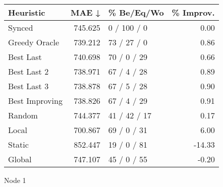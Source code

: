 \begin{tabular}{lrlr}
\toprule
\textbf{Heuristic} & \textbf{MAE ↓} & \textbf{\% Be/Eq/Wo} & \textbf{\% Improv.} \\
\midrule
            Synced &        745.625 &          0 / 100 / 0 &                0.00 \\
     Greedy Oracle &        739.212 &          73 / 27 / 0 &                0.86 \\
         Best Last &        740.698 &          70 / 0 / 29 &                0.66 \\
       Best Last 2 &        738.971 &          67 / 4 / 28 &                0.89 \\
       Best Last 3 &        738.878 &          67 / 5 / 28 &                0.90 \\
    Best Improving &        738.826 &          67 / 4 / 29 &                0.91 \\
            Random &        744.377 &         41 / 42 / 17 &                0.17 \\
             Local &        700.867 &          69 / 0 / 31 &                6.00 \\
            Static &        852.447 &          19 / 0 / 81 &              -14.33 \\
            Global &        747.107 &          45 / 0 / 55 &               -0.20 \\
\bottomrule
\end{tabular}
\caption{Node 1}
\label{tab:non_lr01_le2_bs2_1}
